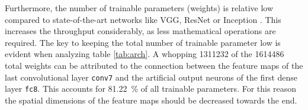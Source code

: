 Furthermore, the number of trainable parameters (weights) is relative low compared to state-of-the-art networks like VGG, ResNet or Inception \cite{training_arch_keras}.
This increases the throughput considerably, as less mathematical operations are required.
The key to keeping the total number of trainable parameter low is evident when analyzing table \ref{tab:arch}.
A whopping \num{1311232} of the \num{1614486} total weights can be attributed to the connection between the feature maps of the last convolutional layer \texttt{conv7} and the artificial output neurons of the first dense layer \texttt{fc8}.
This accounts for \SI{81.22}{\percent} of all trainable parameters.
For this reason the spatial dimensions of the feature maps should be decreased towards the end.

